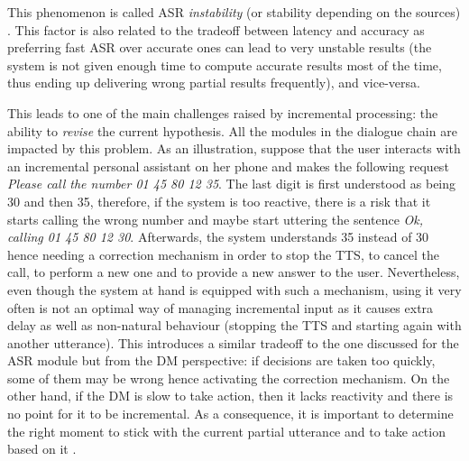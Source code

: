                                                   This phenomenon is called ASR \textit{instability} (or stability depending on the sources) \cite{Selfridge2011}. This factor is also related to the tradeoff between latency and accuracy as preferring fast ASR over accurate ones can lead to very unstable results (the system is not given enough time to compute accurate results most of the time, thus ending up delivering wrong partial results frequently), and vice-versa.
                                                  
This leads to one of the main challenges raised by incremental processing: the ability to \textit{revise} the current hypothesis. All the modules in the dialogue chain are impacted by this problem. As an illustration, suppose that the user interacts with an incremental personal assistant on her phone and makes the following request \textit{Please call the number 01 45 80 12 35}. The last digit is first understood as being 30 and then 35, therefore, if the system is too reactive, there is a risk that it starts calling the wrong number and maybe start uttering the sentence \textit{Ok, calling 01 45 80 12 30}. Afterwards, the system understands 35 instead of 30 hence needing a correction mechanism in order to stop the TTS, to cancel the call, to perform a new one and to provide a new answer to the user. Nevertheless, even though the system at hand is equipped with such a mechanism, using it very often is not an optimal way of managing incremental input as it causes extra delay as well as non-natural behaviour (stopping the TTS and starting again with another utterance). This introduces a similar tradeoff to the one discussed for the ASR module but from the DM perspective: if decisions are taken too quickly, some of them may be wrong hence activating the correction mechanism. On the other hand, if the DM is slow to take action, then it lacks reactivity and there is no point for it to be incremental. As a consequence, it is important to determine the right moment to stick with the current partial utterance and to take action based on it \cite{Raux2008,Lu2011}.

